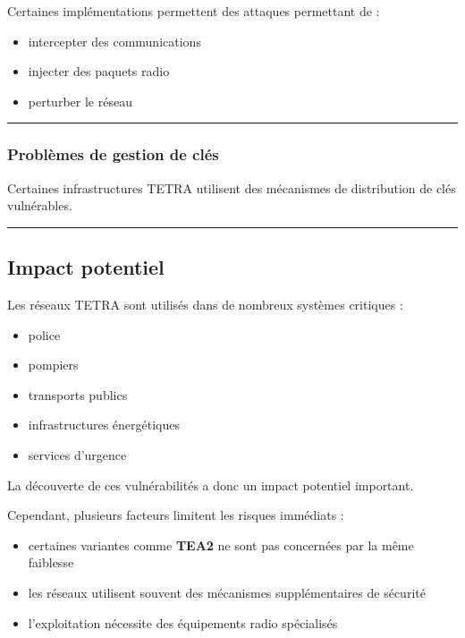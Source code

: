 \documentclass[
  french,
]{article}
\providecommand{\tightlist}{%
  \setlength{\itemsep}{0pt}\setlength{\parskip}{0pt}}
\begin{document}
Certaines implémentations permettent des attaques permettant de :

\begin{itemize}
\tightlist
\item
  intercepter des communications
\item
  injecter des paquets radio
\item
  perturber le réseau
\end{itemize}

\begin{center}\rule{0.5\linewidth}{0.5pt}\end{center}

\subsubsection{Problèmes de gestion de
clés}\label{probluxe8mes-de-gestion-de-cluxe9s}

Certaines infrastructures TETRA utilisent des mécanismes de distribution
de clés vulnérables.

\begin{center}\rule{0.5\linewidth}{0.5pt}\end{center}

\subsection{Impact potentiel}\label{impact-potentiel}

Les réseaux TETRA sont utilisés dans de nombreux systèmes critiques :

\begin{itemize}
\tightlist
\item
  police
\item
  pompiers
\item
  transports publics
\item
  infrastructures énergétiques
\item
  services d'urgence
\end{itemize}

La découverte de ces vulnérabilités a donc un impact potentiel
important.

Cependant, plusieurs facteurs limitent les risques immédiats :

\begin{itemize}
\tightlist
\item
  certaines variantes comme \textbf{TEA2} ne sont pas concernées par la
  même faiblesse
\item
  les réseaux utilisent souvent des mécanismes supplémentaires de
  sécurité
\item
  l'exploitation nécessite des équipements radio spécialisés
\end{itemize}
\end{document}
